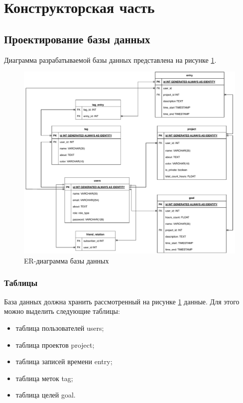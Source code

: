 \section{Конструкторская часть}
\subsection{Проектирование базы данных}
Диаграмма разрабатываемой базы данных представлена на рисунке \ref{fig:ER-db}.

\begin{figure}[hbtp]
	\centering
	\includegraphics[width=\textwidth]{img/er-db.pdf}
	\caption{ER-диаграмма базы данных}
	\label{fig:ER-db}
\end{figure}

\newpage
\subsubsection*{Таблицы}
База данных должна хранить рассмотренный на рисунке \ref{fig:ER-db} данные. Для этого можно выделить следующие таблицы:

\begin{itemize}[leftmargin=1.6\parindent]
	\item таблица пользователей users;
	\item таблица проектов project;
	\item таблица записей времени entry;
	\item таблица меток tag;
	\item таблица целей goal.
\end{itemize}

